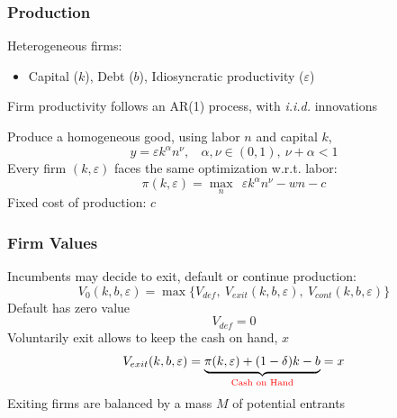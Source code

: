 \documentclass[aspectratio=169,xcolor=table]{beamer}
\begin{document}
\begin{frame}[label=Firms] \frametitle{Production}

Heterogeneous firms: 
\begin{itemize} \small
    \item Capital ($k$), Debt ($b$), Idiosyncratic productivity ($\varepsilon$)
\end{itemize} 
Firm productivity follows an AR(1) process, with \textit{i.i.d.} innovations \normalsize \vspace{3mm}

Produce a homogeneous good, using labor $n$ and capital $k$,
$$ y = \varepsilon k^{\alpha}n^{\nu}, \ \ \ \ \alpha,\nu \in (0,1),  \ \nu + \alpha < 1 $$
Every firm $(k,\varepsilon)$ faces the same optimization w.r.t. labor:
$$ \pi(k,\varepsilon) = \max_{n} \ \  \varepsilon k^{\alpha}n^{\nu} - wn - c$$ 
Fixed cost of production: $c$

\end{frame}


\begin{frame}[label=Firmvalues] \frametitle{Firm Values}

Incumbents may decide to exit, default or continue production: 
\begin{equation*} \label{eq:default decision}
    V_0(k,b,\varepsilon) = \max \{V_{def}, \  V_{exit}(k,b,\varepsilon),  \ V_{cont}(k,b,\varepsilon) \}
\end{equation*}
Default has zero value
$$ V_{def} = 0 $$ 
Voluntarily exit allows to keep the cash on hand, $x$ 
 $$    V_{exit}(k, b, \varepsilon) =  \underbrace{\pi(k,\varepsilon) + (1-\delta)k - b}_{\textcolor{red}{\text{Cash on Hand}}}  = x $$
Exiting firms are balanced by a mass $M$ of potential entrants \hfill \hyperlink{Entrants}{}
\end{frame}
\end{document}
